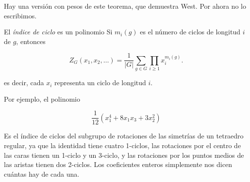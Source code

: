 \begin{remark}
\label{remark-combi-002}
Hay una versión con pesos de este teorema,
que demuestra West. Por ahora no lo
escribimos.
\end{remark}
\begin{definition}
\label{definition-combi-012}
El \emph{índice de ciclo} es un polinomio
Si $m_i(g)$ es el número de ciclos de
longitud $i$ de $g$, entonces

$$
Z_G(x_1,x_2, \ldots) =  \frac{1}{|G|}
\sum_{g\in G}\prod_{i\geq1}x_i^{m_i(g)}.
$$

es decir, cada $x_i$ representa un ciclo de
longitud $i$.
\end{definition}
Por ejemplo, el polinomio

$$
\frac{1}{12}(x^4_1+8x_1x_3+3x^2_2)
$$

Es el índice de ciclos del subgrupo de
rotaciones de las simetrías de un tetraedro
regular, ya que la identidad tiene cuatro
1-ciclos, las rotaciones por el centro de las
caras tienen un 1-ciclo y un 3-ciclo, y las
rotaciones por los puntos medios de las
aristas tienen dos 2-ciclos. Los coeficientes
enteros simplemente nos dicen cuántas hay de
cada una.


